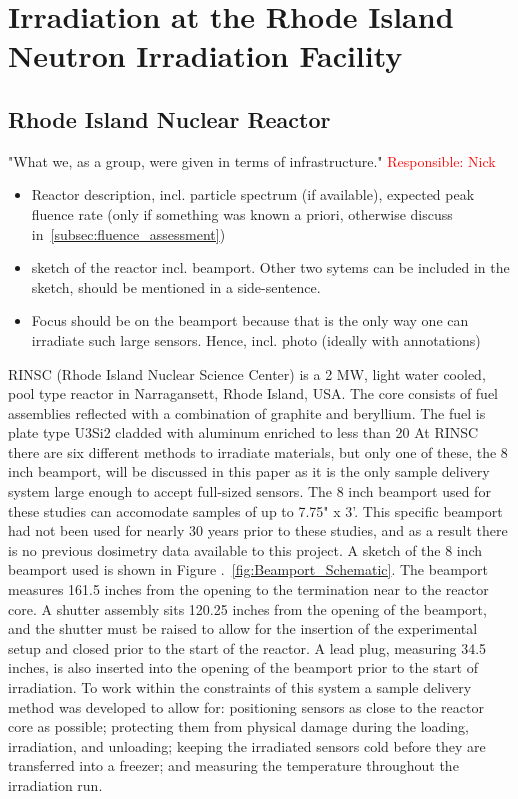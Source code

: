 \section{Irradiation at the Rhode Island Neutron Irradiation Facility}
\label{sec:irradiation}

\subsection{Rhode Island Nuclear Reactor}
\label{subsec:RINSC}
"What we, as a group, were given in terms of infrastructure." \textcolor{red}{Responsible: Nick}
\begin{itemize}
  \item Reactor description, incl. particle spectrum (if available), expected peak fluence rate (only if something was known a priori, otherwise discuss in~\ref{subsec:fluence_assessment})
  \item sketch of the reactor incl. beamport. Other two sytems can be included in the sketch, should be mentioned in a side-sentence.
  \item Focus should be on the beamport because that is the only way one can irradiate such large sensors. Hence, incl. photo (ideally with annotations)
\end{itemize}

RINSC (Rhode Island Nuclear Science Center) is a 2 MW, light water cooled, pool type reactor in Narragansett, Rhode Island, USA.
The core consists of fuel assemblies reflected with a combination of graphite and beryllium.
The fuel is plate type U3Si2 cladded with aluminum enriched to less than 20%
At RINSC there are six different methods to irradiate materials, but only one of these, the 8 inch beamport, will be discussed in this paper as it is the only sample delivery system large enough to accept full-sized sensors.
The 8 inch beamport used for these studies can accomodate samples of up to 7.75" x 3'.
This specific beamport had not been used for nearly 30 years prior to these studies, and as a result there is no previous dosimetry data available to this project.
A sketch of the 8 inch beamport used is shown in Figure .~\ref{fig:Beamport_Schematic}.
The beamport measures 161.5 inches from the opening to the termination near to the reactor core.
A shutter assembly sits 120.25 inches from the opening of the beamport, and the shutter must be raised to allow for the insertion of the experimental setup and closed prior to the start of the reactor.
A lead plug, measuring 34.5 inches, is also inserted into the opening of the beamport prior to the start of irradiation.
To work within the constraints of this system a sample delivery method was developed to allow for: positioning sensors as close to the reactor core as possible; protecting them from physical damage during the loading, irradiation, and unloading; keeping the irradiated sensors cold before they are transferred into a freezer; and measuring the temperature throughout the irradiation run.   


